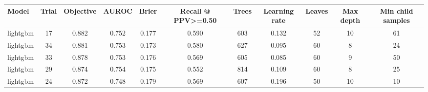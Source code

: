\begin{tabular}{@{}lcccccccccc@{}}
\toprule
Model & Trial & Objective & AUROC & Brier & Recall @ PPV>=0.50 & Trees & Learning rate & Leaves & Max depth & Min child samples\\
\midrule
lightgbm & 17 & 0.882 & 0.752 & 0.177 & 0.590 & 603 & 0.132 & 52 & 10 & 61\\
lightgbm & 34 & 0.881 & 0.753 & 0.173 & 0.580 & 627 & 0.095 & 60 & 8 & 24\\
lightgbm & 33 & 0.878 & 0.753 & 0.176 & 0.569 & 605 & 0.085 & 60 & 9 & 50\\
lightgbm & 29 & 0.874 & 0.754 & 0.175 & 0.552 & 814 & 0.109 & 60 & 8 & 25\\
lightgbm & 24 & 0.872 & 0.748 & 0.179 & 0.569 & 607 & 0.196 & 50 & 10 & 10\\
\bottomrule
\end{tabular}
